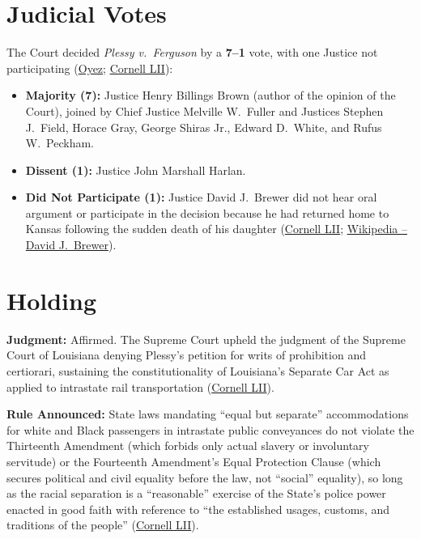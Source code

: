 \documentclass[12pt]{article}
\begin{document}
\section{Judicial Votes}

The Court decided \textit{Plessy v.\ Ferguson} by a \textbf{7--1} vote, with one Justice not participating (\href{https://www.oyez.org/cases/1850-1900/163us537}{Oyez}; \href{https://www.law.cornell.edu/supremecourt/text/163/537}{Cornell LII}):
\begin{itemize}
\item \textbf{Majority (7):} Justice Henry Billings Brown (author of the opinion of the Court), joined by Chief Justice Melville W.\ Fuller and Justices Stephen J.\ Field, Horace Gray, George Shiras Jr., Edward D.\ White, and Rufus W.\ Peckham.
\item \textbf{Dissent (1):} Justice John Marshall Harlan.
\item \textbf{Did Not Participate (1):} Justice David J.\ Brewer did not hear oral argument or participate in the decision because he had returned home to Kansas following the sudden death of his daughter (\href{https://www.law.cornell.edu/supremecourt/text/163/537}{Cornell LII}; \href{https://en.wikipedia.org/wiki/David_J._Brewer}{Wikipedia -- David J.\ Brewer}).
\end{itemize}

\section{Holding}

\textbf{Judgment:} Affirmed. The Supreme Court upheld the judgment of the Supreme Court of Louisiana denying Plessy's petition for writs of prohibition and certiorari, sustaining the constitutionality of Louisiana's Separate Car Act as applied to intrastate rail transportation (\href{https://www.law.cornell.edu/supremecourt/text/163/537}{Cornell LII}).

\textbf{Rule Announced:} State laws mandating ``equal but separate'' accommodations for white and Black passengers in intrastate public conveyances do not violate the Thirteenth Amendment (which forbids only actual slavery or involuntary servitude) or the Fourteenth Amendment's Equal Protection Clause (which secures political and civil equality before the law, not ``social'' equality), so long as the racial separation is a ``reasonable'' exercise of the State's police power enacted in good faith with reference to ``the established usages, customs, and traditions of the people'' (\href{https://www.law.cornell.edu/supremecourt/text/163/537}{Cornell LII}).
\end{document}
